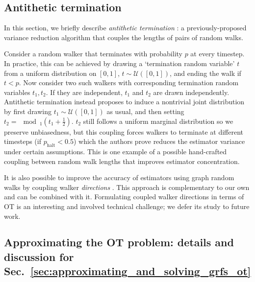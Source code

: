 \subsection{Antithetic termination} \label{app:antithetic_term}
In this section, we briefly describe \emph{antithetic termination} \citep{reid2023quasi}: a previously-proposed variance reduction algorithm that couples the lengths of pairs of random walks.  

Consider a random walker that terminates with probability $p$ at every timestep. 
In practice, this can be achieved by drawing a `termination random variable' $t$ from a uniform distribution on $[0,1]$, $t \sim \mathcal{U}([0,1])$, and ending the walk if $t<p$. 
Now consider two such walkers with corresponding termination random variables $t_1,t_2$. 
If they are independent, $t_1$ and $t_2$ are drawn independently. 
Antithetic termination instead proposes to induce a nontrivial joint distribution by first drawing $t_1 \sim \mathcal{U}([0,1])$ as usual, and then setting $t_2 = \mod_1(t_1 + \frac{1}{2})$. 
$t_2$ still follows a uniform marginal distribution so we preserve unbiasedness, but this coupling forces walkers to terminate at different timesteps (if $p_\textrm{halt}<0.5$) which the authors prove reduces the estimator variance under certain assumptions. 
This is one example of a possible hand-crafted coupling between random walk lengths that improves estimator concentration. 

It is also possible to improve the accuracy of estimators using graph random walks by coupling walker \emph{directions} \citep{reid2023repelling,luo2019distributed}. 
This approach is complementary to our own and can be combined with it. 
Formulating coupled walker directions in terms of OT is an interesting and involved technical challenge; we defer its study to future work. 

\subsection{Approximating the OT problem: details and discussion for Sec.~\ref{sec:approximating_and_solving_grfs_ot}} \label{app:what_are_the_approximations}

%    

